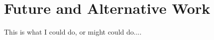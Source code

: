 \chapter{Future and Alternative Work}
\label{ch:future}

This is what I could do, or might could do....
